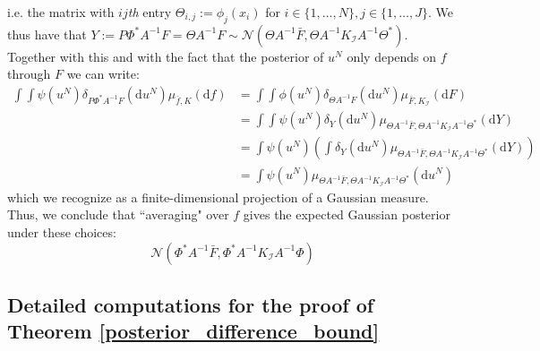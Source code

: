 i.e. the matrix with $ij$\textit{th} entry $\Theta_{i,j}:=\phi_{j}(x_{i})$ for $i\in\{1,\dots,N\},j\in\{1,\dots,J\}$. We thus have that $Y:=P\Phi^{*}A^{-1}F=\Theta A^{-1}F\sim\mathcal{N}(\Theta A^{-1}\bar{F},\Theta A^{-1}K_{\mathcal{I}}A^{-1}\Theta^{*})$. Together with this and with the fact that the posterior of $u^{N}$ only depends on $f$ through $F$ we can write:
\begin{align*}
    \int\int\psi(u^N)\delta_{P\Phi^{*}A^{-1}F}(\mathrm{d}u^N)\mu_{\bar{f},K}(\mathrm{d}f)&=\int\int\phi(u^N)\delta_{\Theta A^{-1}F}(\mathrm{d}u^{N})\mu_{\bar{F},K_{\mathcal{I}}}(\mathrm{d}F) \\
    &=\int\int\psi(u^N)\delta_{Y}(\mathrm{d}u^N)\mu_{\Theta A^{-1}\bar{F},\Theta A^{-1}K_{\mathcal{I}}A^{-1}\Theta^{*}}(\mathrm{d}Y) \\
    &=\int\psi(u^N)\left(\int\delta_{Y}(\mathrm{d}u^N)\mu_{\Theta A^{-1}\bar{F},\Theta A^{-1}K_{\mathcal{I}}A^{-1}\Theta^{*}}(\mathrm{d}Y)\right) \\
    &=\int\psi(u^N)\mu_{\Theta A^{-1}\bar{F},\Theta A^{-1}K_{\mathcal{I}}A^{-1}\Theta^{*}}(\mathrm{d}u^N)
\end{align*}
which we recognize as a finite-dimensional projection of a Gaussian measure. Thus, we conclude that ``averaging" over $f$ gives the expected Gaussian posterior under these choices:
\begin{equation}
    \label{average_posterior_FEM_prior}
    \mathcal{N}(\Phi^{*}A^{-1}\bar{F},\Phi^{*}A^{-1}K_{\mathcal{I}}A^{-1}\Phi)
\end{equation}
\qedsymbol

\subsection{Detailed computations for the proof of Theorem \textcolor{blue}{\ref{posterior_difference_bound}}}

